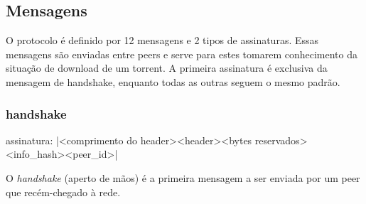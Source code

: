 \subsection*{Mensagens}

O protocolo é definido por 12 mensagens e 2 tipos de assinaturas. Essas mensagens são
enviadas entre \glspl*{peer} e serve para estes tomarem conhecimento da situação de
download de um \gls*{torrent}. A primeira assinatura é exclusiva da mensagem de
handshake, enquanto todas as outras seguem o mesmo padrão.

\subsubsection*{handshake}

assinatura: \bverb|<comprimento do header><header><bytes reservados><info_hash><peer_id>|

O \emph{handshake} (aperto de mãos) é a primeira mensagem a ser enviada por um
\gls*{peer} que recém-chegado à rede.

